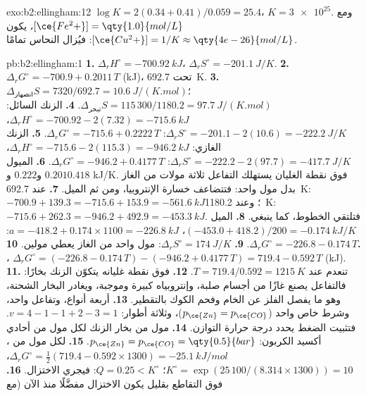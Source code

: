 \begin{solution}{exo:b2:ellingham:12}
$\log K = 2(0.34 + 0.41)/0.059 = 25.4$، $K = \num{3e25}$. ومع
$[\ce{Fe^2+}] = \qty{1.0}{mol/L}$، يكون $[\ce{Cu^2+}] = 1/K \approx
\qty{4e-26}{mol/L}$: فيُزال النحاس تمامًا.
\end{solution}

\begin{solution}{pb:b2:ellingham:1}
\textbf{1.} $\Delta_r H^\circ = \qty{-700.92}{kJ}$، $\Delta_r S^\circ =
\qty{-201.1}{J/K}$.
\textbf{2.} $\Delta_r G^\circ = -700.9 + 0.2011\,T$ (\unit{kJ})، تحت
\qty{692.7}{K}.
\textbf{3.} $\Delta_{\text{انصهار}}S = 7320/692.7 = \qty{10.6}{J/(K.mol)}$؛
$\Delta_{\text{تبخر}}S = 115\,300/1180.2 = \qty{97.7}{J/(K.mol)}$.
\textbf{4.} الزنك السائل: $\Delta_r H^\circ = -700.92 - 2(7.32) = \qty{-715.6}{kJ}$،
$\Delta_r S^\circ = -201.1 - 2(10.6) = \qty{-222.2}{J/K}$: $\Delta_r G^\circ =
-715.6 + 0.2222\,T$.
\textbf{5.} الزنك الغازي: $\Delta_r H^\circ = -715.6 - 2(115.3) = \qty{-946.2}{kJ}$،
$\Delta_r S^\circ = -222.2 - 2(97.7) = \qty{-417.7}{J/K}$: $\Delta_r G^\circ =
-946.2 + 0.4177\,T$.
\textbf{6.} الميول $0.201$ و$0.222$ و$0.418$ \unit{kJ/K}. فوق نقطة
الغليان يستهلك التفاعل ثلاثة مولات من الغاز بدل مول واحد: فتتضاعف خسارة
الإنتروبيا، ومن ثم الميل.
\textbf{7.} عند \qty{692.7}{K}: $-700.9 + 139.3 = -715.6 + 153.9 = \qty{-561.6}{kJ}$؛
وعند \qty{1180.2}{K}: $-715.6 + 262.3 = -946.2 + 492.9 = \qty{-453.3}{kJ}$. فتلتقي
الخطوط، كما ينبغي.
\textbf{8.} الميل $(-453.0 + 418.2)/200 = \qty{-0.174}{kJ/K}$، $a = -418.2 +
0.174 \times 1100 = \qty{-226.8}{kJ}$: $\Delta_r G^\circ = -226.8 - 0.174\,T$.
\textbf{9.} $\Delta_r S^\circ = \qty{+174}{J/K}$: مول واحد من الغاز يعطي مولين.
\textbf{10.} ، $\Delta_r G^\circ = (-226.8 - 0.174\,T)
- (-946.2 + 0.4177\,T) = 719.4 - 0.592\,T$ (\unit{kJ}).
\textbf{11.} تنعدم عند $T = 719.4/0.592 = \qty{1215}{K}$.
\textbf{12.} فوق نقطة غليانه يتكوّن الزنك بخارًا: فالتفاعل يصنع
غازًا من أجسام صلبة، وإنتروبياه كبيرة وموجبة، ويغادر البخار
الشحنة، وهو ما يفصل الفلز عن الخام وفحم الكوك بالتقطير.
\textbf{13.} أربعة أنواع، وتفاعل واحد، وشرط خاص واحد ($p_{\ce{Zn}} =
p_{\ce{CO}}$)، وثلاثة أطوار: $v = 4 - 1 - 1 + 2 - 3 = 1$. فتثبيت الضغط
يحدد درجة حرارة التوازن.
\textbf{14.} مول من بخار الزنك لكل مول من أحادي أكسيد الكربون:
$p_{\ce{Zn}} = p_{\ce{CO}} = \qty{0.5}{bar}$.
\textbf{15.} لكل مول من ، $\Delta_r G^\circ = \frac12(719.4 - 0.592 \times
1300) = \qty{-25.1}{kJ/mol}$، $K^\circ = \exp(25\,100/(8.314 \times 1300)) = 10$؛
$Q = 0.25 < K^\circ$: فيجري الاختزال.
\textbf{16.} فوق التقاطع بقليل يكون الاختزال مفضَّلًا منذ الآن (مع

\end{solution}
